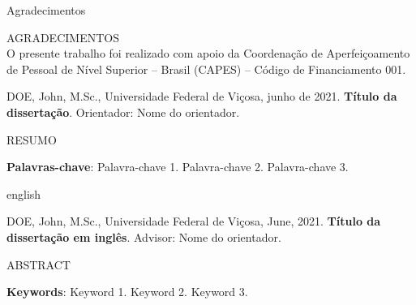 \documentclass[
	12pt,				    %
	openright,			    %
	oneside,			    %
	a4paper,			    %
    sumario=tradicional,    %
	brazil,				    %
	brazil,			    %
	]{abntex2}              %
\begin{document}
\frenchspacing

\pretextual


{
    \singlespacing
    \imprimirfolhaderosto
    \clearpage
}





\huge
\begin{center}
{\selectfont Agradecimentos}
\end{center}
\vspace{0.8cm}
\normalsize
AGRADECIMENTOS\\
O presente trabalho foi realizado com apoio da Coordenação de Aperfeiçoamento de Pessoal de Nível Superior – Brasil (CAPES) – Código de Financiamento 001.
\cleardoublepage


\begin{resumo}[Resumo]

\vspace{0.35cm}
\singlespacing
DOE, John, M.Sc., Universidade Federal de Viçosa, junho de 2021. \textbf{Título da dissertação}. Orientador: Nome do orientador.

\vspace{\onelineskip}

{}
{
    RESUMO\\
}

\vspace{\onelineskip}

\noindent
\textbf{Palavras-chave}: Palavra-chave 1. Palavra-chave 2. Palavra-chave 3.

\end{resumo}

\begin{resumo}[Abstract]
 \begin{otherlanguage*}{english}
 
\vspace{0.35cm}
\singlespacing
DOE, John, M.Sc., Universidade Federal de Viçosa, June, 2021. \textbf{Título da dissertação em inglês}. Advisor: Nome do orientador.

\vspace{\onelineskip}

{}
{
    ABSTRACT\\
}

   \vspace{\onelineskip}

   \noindent
   \textbf{Keywords}: Keyword 1. Keyword 2. Keyword 3.
 \end{otherlanguage*}
\end{resumo}
\end{document}
